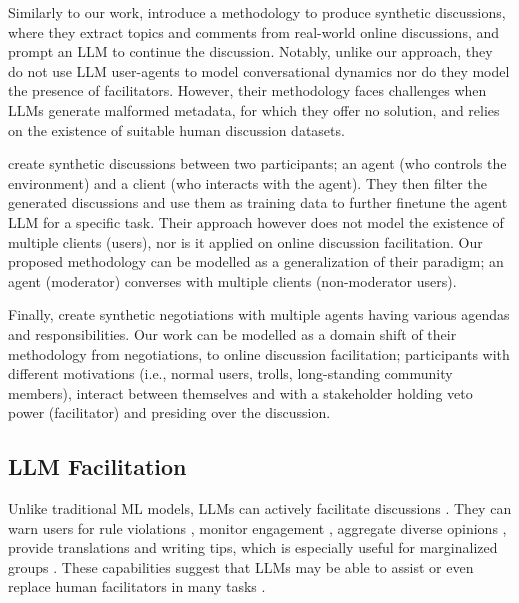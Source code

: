 Similarly to our work, \citet{balog_2024} introduce a methodology to produce synthetic discussions, where they extract topics and comments from real-world online discussions, and prompt an \ac{LLM} to continue the discussion. Notably, unlike our approach, they do not use \ac{LLM} user-agents to model conversational dynamics nor do they model the presence of facilitators. However, their methodology faces challenges when \acp{LLM} generate malformed metadata, for which they offer no solution, and relies on the existence of suitable human discussion datasets.

\citet{ulmer2024} create synthetic discussions between two participants; an agent (who controls the environment) and a client (who interacts with the agent). They then filter the generated discussions and use them as training data to further finetune the agent \ac{LLM} for a specific task. Their approach however does not model the existence of multiple clients (users), nor is it applied on online discussion facilitation. Our proposed methodology can be modelled as a generalization of their paradigm; an agent (moderator) converses with multiple clients (non-moderator users).

Finally, \citet{abdelnabi_negotiations} create synthetic negotiations with multiple agents having various agendas and responsibilities. Our work can be modelled as a domain shift of their methodology from negotiations, to online discussion facilitation; participants with different motivations (i.e., normal users, trolls, long-standing community members), interact between themselves and with a stakeholder holding veto power (facilitator) and presiding over the discussion.


\subsection{LLM Facilitation}

Unlike traditional \ac{ML} models, \acp{LLM} can actively facilitate discussions \cite{korre2025evaluation}. They can warn users for rule violations \cite{Kumar_AbuHashem_Durumeric_2024}, monitor engagement \cite{schroeder-etal-2024-fora}, aggregate diverse opinions \cite{small-polis-llm}, provide translations and writing tips, which is especially useful for marginalized groups \cite{Tsai2024Generative}. These capabilities suggest that \acp{LLM} may be able to assist or even replace human facilitators in many tasks \cite{seering_self_moderation}.

